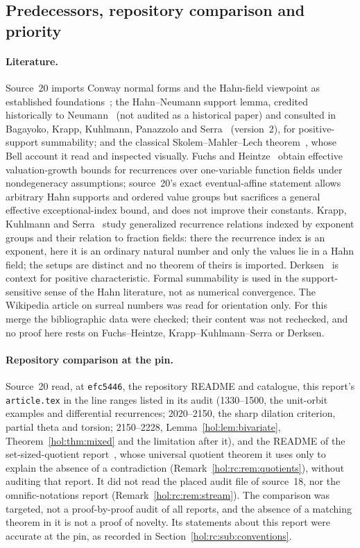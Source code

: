 \documentclass[11pt]{article}
\numberwithin{equation}{section}
\theoremstyle{definition}
\theoremstyle{remark}
\begin{document}
\subsection{Predecessors, repository comparison and priority}
\label{hol:rc:sub:predecessors}

\paragraph{Literature.}
Source~20 imports Conway normal forms and the Hahn-field viewpoint as
established foundations~\cite{bm}; the Hahn--Neumann support lemma, credited
historically to Neumann~\cite{neumann} (not audited as a historical paper) and
consulted in Bagayoko, Krapp, Kuhlmann, Panazzolo and Serra~\cite{bagayoko}
(version~2), for positive-support summability; and the classical
Skolem--Mahler--Lech theorem~\cite{lech,belldoc}, whose Bell account it read
and inspected visually. Fuchs and Heintze~\cite{fuchsheintze} obtain effective
valuation-growth bounds for recurrences over one-variable function fields
under nondegeneracy assumptions; source~20's exact eventual-affine statement
allows arbitrary Hahn supports and ordered value groups but sacrifices a
general effective exceptional-index bound, and does not improve their
constants. Krapp, Kuhlmann and Serra~\cite{kkslinrec} study generalized
recurrence relations indexed by exponent groups and their relation to
fraction fields: there the recurrence index is an exponent, here it is an
ordinary natural number and only the values lie in a Hahn field; the setups
are distinct and no theorem of theirs is imported. Derksen~\cite{derksen} is
context for positive characteristic. Formal summability is used in the
support-sensitive sense of the Hahn literature, not as numerical
convergence. The Wikipedia article on surreal numbers was read for
orientation only. For this merge the bibliographic data were checked; their
content was not rechecked, and no proof here rests on Fuchs--Heintze,
Krapp--Kuhlmann--Serra or Derksen.

\paragraph{Repository comparison at the pin.}
Source~20 read, at \texttt{efc5446}, the repository README and catalogue, this
report's \texttt{article.tex} in the line ranges listed in its audit
(1330--1500, the unit-orbit examples and differential recurrences; 2020--2150,
the sharp dilation criterion, partial theta and torsion; 2150--2228,
Lemma~\ref{hol:lem:bivariate}, Theorem~\ref{hol:thm:mixed} and the limitation
after it), and the README of the set-sized-quotient report~\cite{repoosq},
whose universal quotient theorem it uses only to explain the absence of a
contradiction (Remark~\ref{hol:rc:rem:quotients}), without auditing that
report. It did not read the placed audit file of source~18, nor the
omnific-notations report (Remark~\ref{hol:rc:rem:stream}). The comparison was
targeted, not a proof-by-proof audit of all reports, and the absence of a
matching theorem in it is not a proof of novelty. Its statements about this
report were accurate at the pin, as recorded in
Section~\ref{hol:rc:sub:conventions}.
\end{document}
